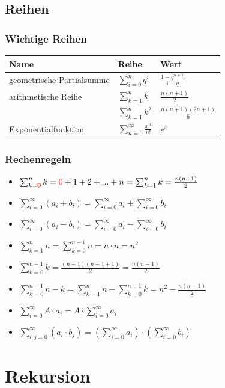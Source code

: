 \documentclass[a4paper,10pt]{article}
\newcommand{\Sum}[2]{\sum_{#1}^{#2}} %
\begin{document}
\subsection{Reihen}
\subsubsection{Wichtige Reihen}
\begin{tabular}{|l|l|l|}
\hline
Name&Reihe&Wert\\\hline\hline
geometrische Partialsumme&$\Sum{i=0}{n}q^i$&$\frac{1-q^{n+1}}{1-q}$\\\hline
arithmetische Reihe&$\Sum{k=1}{n}k$&$\frac{n(n+1)}{2}$\\\hline
&$\Sum{k=1}{n}k^2$&$\frac{n(n+1)(2n+1)}{6}$\\\hline
Exponentialfunktion&$\Sum{n=0}{\infty}\frac{x^n}{n!}$&$e^x$\\\hline
\end{tabular}
\subsubsection{Rechenregeln}
\begin{itemize}
	\item $\sum_{k=\textcolor{red}{\textbf{0}}}^n{k} = \textcolor{red}{0}+1+2+...+n = \Sum{k=1}{n}k = \frac{n(n+1)}{2}$ 

	\item $\Sum{i=0}{\infty}(a_i+b_i)=\Sum{i=0}{\infty}a_i+\Sum{i=0}{\infty}b_i$
	\item $\Sum{i=0}{\infty}(a_i-b_i)=\Sum{i=0}{\infty}a_i-\Sum{i=0}{\infty}b_i$
		\item  $\sum_{k=1}^{n}{n} =  \sum_{k=0}^{n-1}{n} = n \cdot n = n^2$
			\item $\sum_{k=0}^{n-1}{k} =  \frac{(n-1)(n-1+1)}{2} = \frac{n(n-1)}{2}$
		\item $\sum_{k=0}^{n-1}{n-k} = \sum_{k=1}^{n}{n} - \sum_{k=0}^{n-1}{k} = n^2 - \frac{n(n-1)}{2}$

	\item $\Sum{i=0}{\infty}A\cdot a_i=A\cdot \Sum{i=0}{\infty}a_i$
	\item $\Sum{i,j=0}{\infty}(a_i\cdot b_j)=(\Sum{i=0}{\infty}a_i)\cdot(\Sum{i=0}{\infty}b_i)$
	

\end{itemize}

\section{Rekursion}
\end{document}
